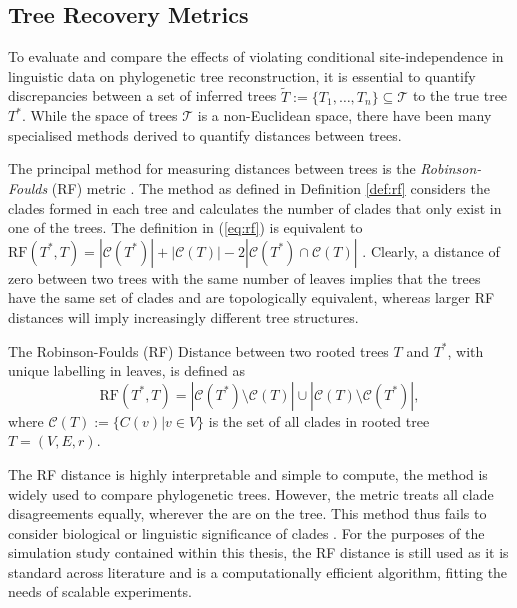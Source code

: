 \subsection{Tree Recovery Metrics}
\label{sec:treerecoverymetrics}
To evaluate and compare the effects of violating conditional site-independence in linguistic data on phylogenetic tree reconstruction, it is essential to quantify discrepancies between a set of inferred trees $\tilde{T} := \{T_1, \dots, T_n\} \subseteq \mathcal{T}$ to the true tree $T^*$. While the space of trees $\mathcal{T}$ is a non-Euclidean space, there have been many specialised methods derived to quantify distances between trees. 

The principal method for measuring distances between trees is the \textit{Robinson-Foulds} (RF) metric \cite{RF1981}. The method as defined in Definition \ref{def:rf} considers the clades formed in each tree and calculates the number of clades that only exist in one of the trees. The definition in (\ref{eq:rf}) is equivalent to $\text{RF}(T^*, T) = |\mathcal{C}(T^*)| + |\mathcal{C}(T)| - 2|\mathcal{C}(T^*) \cap \mathcal{C}(T)|$ \cite{Branco2024}. Clearly, a distance of zero between two trees with the same number of leaves implies that the trees have the same set of clades and are topologically equivalent, whereas larger RF distances will imply increasingly different tree structures.

\begin{definition} 
\label{def:rf}
    The Robinson-Foulds (RF) Distance between two rooted trees $T$ and $T^*$, with unique labelling in leaves, is defined as
    \begin{equation}
        \label{eq:rf}
        \text{RF}(T^*, T) = |\mathcal{C}(T^*) \setminus \mathcal{C}(T)| \cup |\mathcal{C}(T) \setminus\mathcal{C}(T^*)|,
    \end{equation}
    where $\mathcal{C}(T) := \{C(v) | v \in V\}$ is the set of all clades in rooted tree $T = (V, E, r)$.
\end{definition}

The RF distance is highly interpretable and simple to compute, the method is widely used to compare phylogenetic trees. However, the metric treats all clade disagreements equally, wherever the are on the tree. This method thus fails to consider biological or linguistic significance of clades \cite{Branco2024}. For the purposes of the simulation study contained within this thesis, the RF distance is still used as it is standard across literature and is a computationally efficient algorithm, fitting the needs of scalable experiments.

